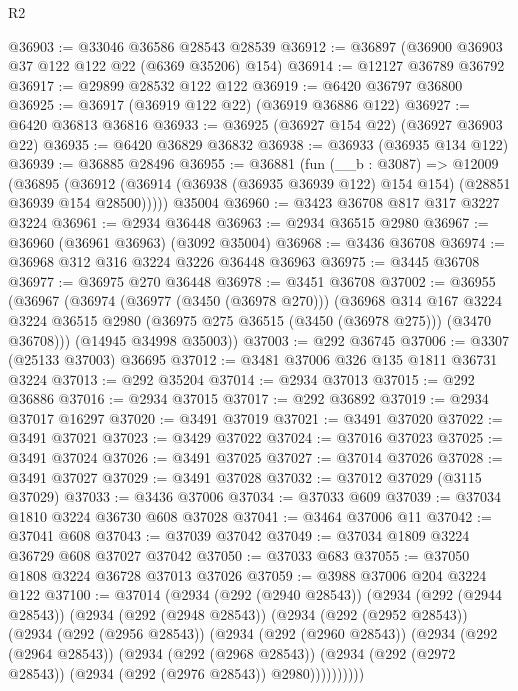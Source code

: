 \begin{lexlean}{R2}
\begin{coremodule}
@36903 := @33046 @36586 @28543 @28539
@36912 := @36897 (@36900 @36903 @37 @122 @122 @22 (@6369 @35206) @154)
@36914 := @12127 @36789 @36792
@36917 := @29899 @28532 @122 @122
@36919 := @6420 @36797 @36800
@36925 := @36917 (@36919 @122 @22) (@36919 @36886 @122)
@36927 := @6420 @36813 @36816
@36933 := @36925 (@36927 @154 @22) (@36927 @36903 @22)
@36935 := @6420 @36829 @36832
@36938 := @36933 (@36935 @134 @122)
@36939 := @36885 @28496
@36955 := @36881
    (fun (__b : @3087) =>
    @12009
      (@36895
        (@36912 (@36914 (@36938 (@36935 @36939 @122) @154 @154) (@28851 @36939 @154 @28500)))))
    @35004
@36960 := @3423 @36708 @817 @317 @3227 @3224
@36961 := @2934 @36448
@36963 := @2934 @36515 @2980
@36967 := @36960 (@36961 @36963) (@3092 @35004)
@36968 := @3436 @36708
@36974 := @36968 @312 @316 @3224 @3226 @36448 @36963
@36975 := @3445 @36708
@36977 := @36975 @270 @36448
@36978 := @3451 @36708
@37002 := @36955
    (@36967
      (@36974
        (@36977 (@3450 (@36978 @270)))
        (@36968
          @314
          @167
          @3224
          @3224
          @36515
          @2980
          (@36975 @275 @36515 (@3450 (@36978 @275)))
          (@3470 @36708)))
      (@14945 @34998 @35003))
@37003 := @292 @36745
@37006 := @3307 (@25133 @37003) @36695
@37012 := @3481 @37006 @326 @135 @1811 @36731 @3224
@37013 := @292 @35204
@37014 := @2934 @37013
@37015 := @292 @36886
@37016 := @2934 @37015
@37017 := @292 @36892
@37019 := @2934 @37017 @16297
@37020 := @3491 @37019
@37021 := @3491 @37020
@37022 := @3491 @37021
@37023 := @3429 @37022
@37024 := @37016 @37023
@37025 := @3491 @37024
@37026 := @3491 @37025
@37027 := @37014 @37026
@37028 := @3491 @37027
@37029 := @3491 @37028
@37032 := @37012 @37029 (@3115 @37029)
@37033 := @3436 @37006
@37034 := @37033 @609
@37039 := @37034 @1810 @3224 @36730 @608 @37028
@37041 := @3464 @37006 @11
@37042 := @37041 @608
@37043 := @37039 @37042
@37049 := @37034 @1809 @3224 @36729 @608 @37027 @37042
@37050 := @37033 @683
@37055 := @37050 @1808 @3224 @36728 @37013 @37026
@37059 := @3988 @37006 @204 @3224 @122
@37100 := @37014
    (@2934
      (@292 (@2940 @28543))
      (@2934
        (@292 (@2944 @28543))
        (@2934
          (@292 (@2948 @28543))
          (@2934
            (@292 (@2952 @28543))
            (@2934
              (@292 (@2956 @28543))
              (@2934
                (@292 (@2960 @28543))
                (@2934
                  (@292 (@2964 @28543))
                  (@2934
                    (@292 (@2968 @28543))
                    (@2934 (@292 (@2972 @28543)) (@2934 (@292 (@2976 @28543)) @2980))))))))))

\end{coremodule}
\end{lexlean}
